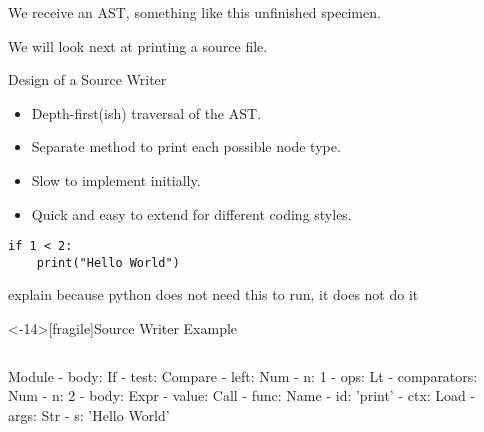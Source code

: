 We receive an AST, something like this unfinished specimen.


We will look next at printing a source file.

\begin{frame}[fragile]{Design of a Source Writer}
\begin{itemize}
\item Depth-first(ish) traversal of the AST.
\item Separate method to print each possible node type.
\item Slow to implement initially.
\item Quick and easy to extend for different coding styles.
\end{itemize}

\begin{lstlisting}
if 1 < 2:
    print("Hello World")
\end{lstlisting}
\end{frame}

explain because python does not need this to run, it does not do it


\begin{frame}<-14>[fragile]{Source Writer Example}
\begin{columns}[b]
{\small
\begin{semiverbatim}
\alert<2-13>{Module}
\alert<2-13>{  - body: If}
\alert<3-5>{    - test: Compare}
\alert<3>{      - left: Num}
\alert<3>{        - n: 1}
\alert<4>{      - ops: Lt}
\alert<5>{      - comparators: Num}
\alert<5>{        - n: 2}
\alert<7-13>{    - body: Expr}
\alert<7-13>{      - value: Call}
\alert<7-8>{        - func: Name}
\alert<7>{          - id: 'print'}
\alert<8>{          - ctx: Load}
\alert<10-12>{        - args: Str}
\alert<11>{          - s: 'Hello World'}
\end{semiverbatim}}
\begin{semiverbatim}
\textbf{
  
\quad\quad{}
}
\end{semiverbatim}
\end{columns}
\end{frame}


